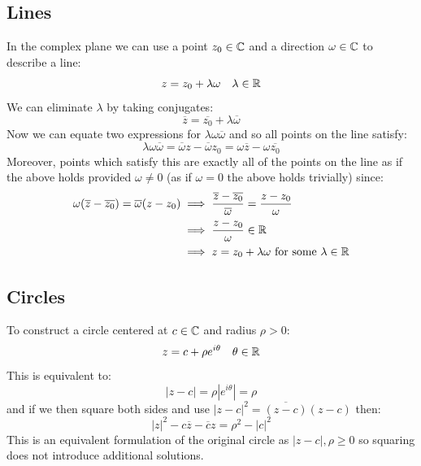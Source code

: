 \documentclass[../main.tex]{subfiles}
\begin{document}
\subsection{Lines}
In the complex plane we can use a point $z_0 \in \mathbb{C}$ and a direction $\omega \in \mathbb{C}$ to describe a line:
\[
  z = z_0 + \lambda \omega \quad \lambda \in \mathbb{R}
\]
We can eliminate $\lambda$ by taking conjugates:
\[
  \overline{z} = \overline{z_0} + \lambda \overline{\omega}
\]
Now we can equate two expressions for $\lambda \omega \overline{\omega}$ and so all points on the line satisfy:
\[
  \lambda \omega \overline{\omega} = \overline{\omega}z - \overline{\omega}z_0 = \omega \overline{z} - \omega \overline{z_0}
\]
Moreover, points which satisfy this are exactly all of the points on the line as if the above holds provided $\omega \neq 0$ (as if $\omega = 0$ the above holds trivially) since:
\begin{align*}
  \omega(\overline{z} - \overline{z_0}) = \overline{\omega}(z - z_0) &\implies \frac{\overline{z} - \overline{z_0}}{\overline{\omega}} = \frac{z - z_0}{\omega} \\
                                                                     &\implies \frac{z - z_0}{\omega} \in \mathbb{R} \\
                                                                     &\implies z = z_0 + \lambda \omega \text{ for some } \lambda \in \mathbb{R}
\end{align*}
\subsection{Circles}
To construct a circle centered at $c \in \mathbb{C}$ and radius $\rho > 0$:
\[
  z = c + \rho e^{i\theta} \quad \theta \in \mathbb{R}
\]
This is equivalent to:
\[
  |z - c| = \rho |e^{i\theta}| = \rho
\]
and if we then square both sides and use $|z-c|^2 = \overline{(z - c)}(z - c)$ then:
\[
  |z|^2 - c\overline{z} - \overline{c}z = \rho^2 - |c|^2
\]
This is an equivalent formulation of the original circle as $|z - c|, \rho \geq 0$ so squaring does not introduce additional solutions.
\end{document}
